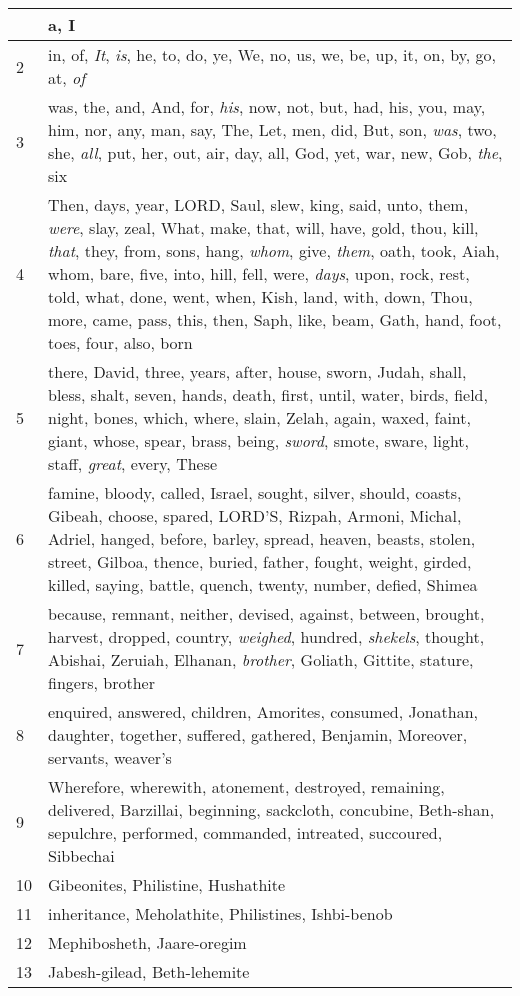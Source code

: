 \begin{longtable}{l|p{3.75in}}
\hline \hline
\endlastfoot
1 & a, I \\ \hline
2 & in, of, \emph{It}, \emph{is}, he, to, do, ye, We, no, us, we, be, up, it, on, by, go, at, \emph{of} \\ \hline
3 & was, the, and, And, for, \emph{his}, now, not, but, had, his, you, may, him, nor, any, man, say, The, Let, men, did, But, son, \emph{was}, two, she, \emph{all}, put, her, out, air, day, all, God, yet, war, new, Gob, \emph{the}, six \\ \hline
4 & Then, days, year, LORD, Saul, slew, king, said, unto, them, \emph{were}, slay, zeal, What, make, that, will, have, gold, thou, kill, \emph{that}, they, from, sons, hang, \emph{whom}, give, \emph{them}, oath, took, Aiah, whom, bare, five, into, hill, fell, were, \emph{days}, upon, rock, rest, told, what, done, went, when, Kish, land, with, down, Thou, more, came, pass, this, then, Saph, like, beam, Gath, hand, foot, toes, four, also, born \\ \hline
5 & there, David, three, years, after, house, sworn, Judah, shall, bless, shalt, seven, hands, death, first, until, water, birds, field, night, bones, which, where, slain, Zelah, again, waxed, faint, giant, whose, spear, brass, being, \emph{sword}, smote, sware, light, staff, \emph{great}, every, These \\ \hline
6 & famine, bloody, called, Israel, sought, silver, should, coasts, Gibeah, choose, spared, LORD'S, Rizpah, Armoni, Michal, Adriel, hanged, before, barley, spread, heaven, beasts, stolen, street, Gilboa, thence, buried, father, fought, weight, girded, killed, saying, battle, quench, twenty, number, defied, Shimea \\ \hline
7 & because, remnant, neither, devised, against, between, brought, harvest, dropped, country, \emph{weighed}, hundred, \emph{shekels}, thought, Abishai, Zeruiah, Elhanan, \emph{brother}, Goliath, Gittite, stature, fingers, brother \\ \hline
8 & enquired, answered, children, Amorites, consumed, Jonathan, daughter, together, suffered, gathered, Benjamin, Moreover, servants, weaver's \\ \hline
9 & Wherefore, wherewith, atonement, destroyed, remaining, delivered, Barzillai, beginning, sackcloth, concubine, Beth-shan, sepulchre, performed, commanded, intreated, succoured, Sibbechai \\ \hline
10 & Gibeonites, Philistine, Hushathite \\ \hline
11 & inheritance, Meholathite, Philistines, Ishbi-benob \\ \hline
12 & Mephibosheth, Jaare-oregim \\ \hline
13 & Jabesh-gilead, Beth-lehemite \\ \hline
\end{longtable}







